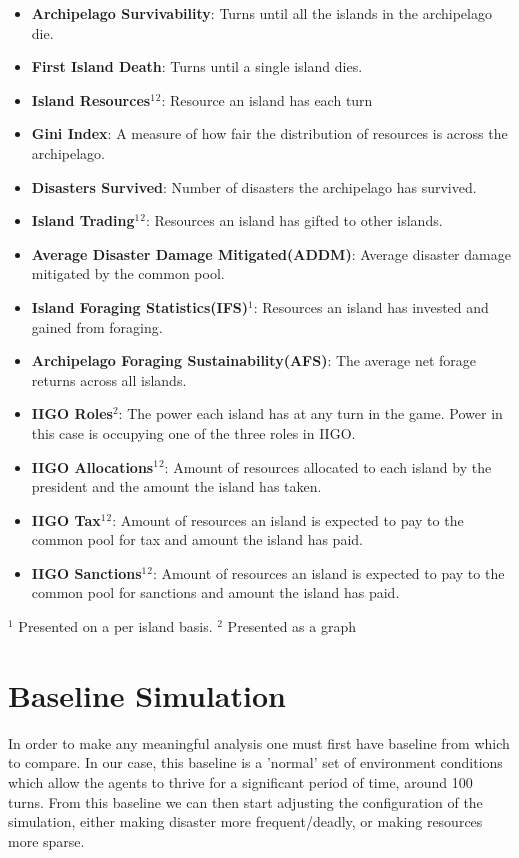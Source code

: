 \begin{itemize}
    \item \textbf{Archipelago Survivability}: Turns until all the islands in the archipelago die.
    \item \textbf{First Island Death}: Turns until a single island dies.
    \item \textbf{Island Resources$^1$$^2$}: Resource an island has each turn
    \item \textbf{Gini Index}: A measure of how fair the distribution of resources is across the archipelago.
    \item \textbf{Disasters Survived}: Number of disasters the archipelago has survived.
    \item \textbf{Island Trading$^1$$^2$}: Resources an island has gifted to other islands.
    \item \textbf{Average Disaster Damage Mitigated(ADDM)}: Average disaster damage mitigated by the common pool.
    \item \textbf{Island Foraging Statistics(IFS)$^1$}: Resources an island has invested and gained from foraging.
    \item \textbf{Archipelago Foraging Sustainability(AFS)}: The average net forage returns across all islands.
    \item \textbf{IIGO Roles$^2$}: The power each island has at any turn in the game. Power in this case is occupying one of the three roles in IIGO.
    \item \textbf{IIGO Allocations$^1$$^2$}: Amount of resources allocated to each island by the president and the amount the island has taken.
    \item \textbf{IIGO Tax$^1$$^2$}: Amount of resources an island is expected to pay to the common pool for tax and amount the island has paid.
    \item \textbf{IIGO Sanctions$^1$$^2$}: Amount of resources an island is expected to pay to the common pool for sanctions and amount the island has paid.
    
\end{itemize}
\small{$^1$ Presented on a per island basis. $^2$ Presented as a graph}

\section{Baseline Simulation}
\label{sec:Simulations:baseline}

In order to make any meaningful analysis one must first have baseline from which to compare. In our case, this baseline is a 'normal' set of environment conditions which allow the agents to thrive for a significant period of time, around 100 turns. From this baseline we can then start adjusting the configuration of the simulation, either making disaster more frequent/deadly, or making resources more sparse.

